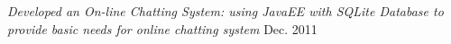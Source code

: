 \documentclass[margin, 10pt]{res}%
\begin{document}
\begin{resume}
{\sl Developed an On-line Chatting System: using JavaEE with SQLite Database to provide basic needs for online chatting system} \hfill Dec. 2011\\




\end{resume}
\end{document}

